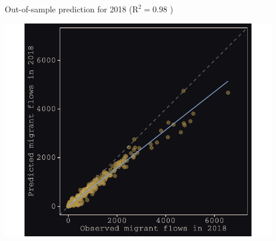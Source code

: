 \documentclass{beamer}
\begin{document}
\begin{frame}{Out-of-sample prediction for 2018 ($\text{R}^{2} = 0.98$ )}
\begin{center}
	\includegraphics[width=0.9\textwidth]{../../fig/p_o_plot}
\end{center}
\end{frame}
\end{document}
